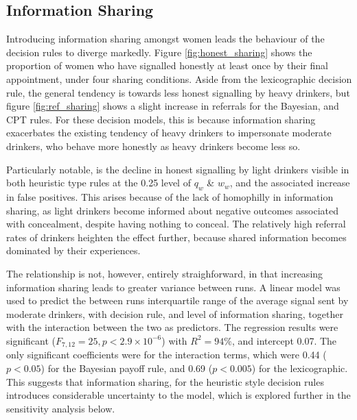 \subsection{Information Sharing}
\label{sub:sharing_results}

Introducing information sharing amongst women leads the behaviour of the decision rules to diverge markedly. Figure \ref{fig:honest_sharing} shows the proportion of women who have signalled honestly at least once by their final appointment, under four sharing conditions. Aside from the lexicographic decision rule, the general tendency is towards less honest signalling by heavy drinkers, but figure \ref{fig:ref_sharing} shows a slight increase in referrals for the Bayesian, and \ac{CPT} rules. For these decision models, this is because information sharing exacerbates the existing tendency of heavy drinkers to impersonate moderate drinkers, who behave more honestly as heavy drinkers become less so.

Particularly notable, is the decline in honest signalling by light drinkers visible in both heuristic type rules at the 0.25 level of \(q_{w}\) \& \(w_{w}\), and the associated increase in false positives. This arises because of the lack of homophilly in information sharing, as light drinkers become informed about negative outcomes associated with concealment, despite having nothing to conceal. The relatively high referral rates of drinkers heighten the effect further, because shared information becomes dominated by their experiences. 

The relationship is not, however, entirely straighforward, in that increasing information sharing leads to greater variance between runs. A linear model was used to predict the between runs interquartile range of the average signal sent by moderate drinkers, with decision rule, and level of information sharing, together with the interaction between the two as predictors. The regression results were significant (\(F_{7,12}=25,p<2.9\times10^{-6}\)) with \(R^2=94\%\), and intercept 0.07. The only significant coefficients were for the interaction terms, which were 0.44 (\(p<0.05\)) for the Bayesian payoff rule, and 0.69 (\(p<0.005\)) for the lexicographic. This suggests that information sharing, for the heuristic style decision rules introduces considerable uncertainty to the model, which is explored further in the sensitivity analysis below.

